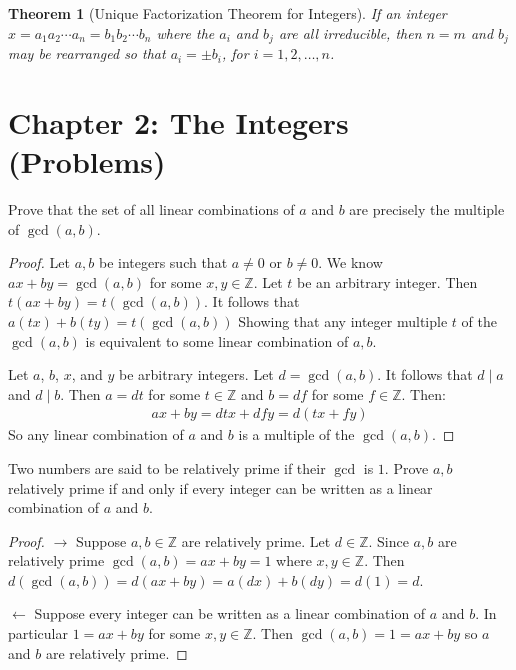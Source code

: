 \documentclass[8pt]{article}
\newtheorem{theorem}{Theorem}
\begin{document}
\begin{theorem}[Unique Factorization Theorem for Integers]
    If an integer $x = a_1 a_2 \cdots a_n = b_1 b_2 \cdots b_n$ where 
    the $a_i$ and $b_j$ are all irreducible, then $n = m$ and $b_j$ 
    may be rearranged so that $a_i = \pm b_i$, for $i = 1, 2, \ldots, n$.
\end{theorem}

\section{Chapter 2: The Integers (Problems)}

\begin{tcolorbox}[title=Problem 3, breakable]
    Prove that the set of all linear combinations of $a$ and $b$
    are precisely the multiple of $\gcd(a, b)$.
\end{tcolorbox}

\begin{proof}
    Let $a, b$ be integers such that $a \not = 0$ or $b \not = 0$.
    We know $ax + by = \gcd(a, b)$ for some $x, y \in \mathbb{Z}$.
    Let $t$ be an arbitrary integer.
    Then $t(ax + by) = t(\gcd(a, b))$.
    It follows that $a(tx) + b(ty) = t(\gcd(a, b))$
    Showing that any integer multiple $t$ of the $\gcd(a, b)$
    is equivalent to some linear combination of $a, b$.

    Let $a$, $b$, $x$, and $y$ be arbitrary integers.
    Let $d = \gcd(a, b)$. It follows that $d \mid a$ and $d \mid b$.
    Then $a = dt$ for some $t \in \mathbb{Z}$ and $b = df$ for some $f \in \mathbb{Z}$.
    Then:
    \begin{align*}
        ax + by = dtx  + dfy = d(tx + fy)
    \end{align*}
    So any linear combination of $a$ and $b$ is a multiple of the $\gcd(a, b)$.
\end{proof}

\begin{tcolorbox}[title=Problem 4, breakable]
    Two numbers are said to be relatively prime if their $\gcd$ is $1$.
    Prove $a, b$ relatively prime if and only if every integer can be written
    as a linear combination of $a$ and $b$.
\end{tcolorbox}

\begin{proof}
    $\rightarrow$ Suppose $a, b \in \mathbb{Z}$ are relatively prime.
    Let $d \in \mathbb{Z}$. Since $a, b$ are relatively prime $\gcd(a, b) = ax + by = 1$ where $x, y \in \mathbb{Z}$.
    Then $d(\gcd(a, b)) = d(ax + by) = a(dx) + b(dy) = d(1) = d$.

    $\leftarrow$ Suppose every integer can be written as a linear combination of $a$ and $b$.
    In particular $1 = ax + by$ for some $x, y \in \mathbb{Z}$.
    Then $\gcd(a, b) = 1 = ax + by$ so $a$ and $b$ are relatively prime.
\end{proof}
\end{document}
